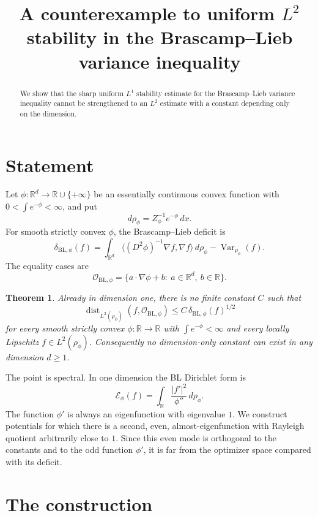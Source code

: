 \documentclass{article}
\title{A counterexample to uniform $L^2$ stability in the Brascamp--Lieb variance inequality}
\author{}
\date{}
\newtheorem{theorem}{Theorem}[section]
\theoremstyle{remark}
\DeclareMathOperator{\Var}{Var}
\DeclareMathOperator{\dist}{dist}
\begin{document}
\maketitle

\begin{abstract}
We show that the sharp uniform $L^1$ stability estimate for the Brascamp--Lieb
variance inequality cannot be strengthened to an $L^2$ estimate with a constant
depending only on the dimension.
\end{abstract}

\section{Statement}

Let $\phi:\mathbb{R}^d\to\mathbb{R}\cup\{+\infty\}$ be an essentially continuous
convex function with $0<\int e^{-\phi}<\infty$, and put
\[
  d\rho_\phi = Z_\phi^{-1}e^{-\phi}\,dx .
\]
For smooth strictly convex $\phi$, the Brascamp--Lieb deficit is
\[
  \delta_{\mathrm{BL},\phi}(f)
  =
  \int_{\mathbb{R}^d}
  \bigl\langle (D^2\phi)^{-1}\nabla f,\nabla f\bigr\rangle\,d\rho_\phi
  - \Var_{\rho_\phi}(f).
\]
The equality cases are
\[
  \mathcal O_{\mathrm{BL},\phi}
  =
  \{a\cdot \nabla \phi+b:\ a\in\mathbb R^d,\ b\in\mathbb R\}.
\]

\begin{theorem}\label{thm:l2-fails}
Already in dimension one, there is no finite constant $C$ such that
\[
  \dist_{L^2(\rho_\phi)}(f,\mathcal O_{\mathrm{BL},\phi})
  \le C\,\delta_{\mathrm{BL},\phi}(f)^{1/2}
\]
for every smooth strictly convex $\phi:\mathbb R\to\mathbb R$ with
$\int e^{-\phi}<\infty$ and every locally Lipschitz $f\in L^2(\rho_\phi)$.
Consequently no dimension-only constant can exist in any dimension $d\ge 1$.
\end{theorem}

The point is spectral.  In one dimension the BL Dirichlet form is
\[
  \mathcal E_\phi(f)=\int_{\mathbb R}\frac{|f'|^2}{\phi''}\,d\rho_\phi .
\]
The function $\phi'$ is always an eigenfunction with eigenvalue $1$.  We construct
potentials for which there is a second, even, almost-eigenfunction with Rayleigh
quotient arbitrarily close to $1$.  Since this even mode is orthogonal to the
constants and to the odd function $\phi'$, it is far from the optimizer space
compared with its deficit.

\section{The construction}
\end{document}
